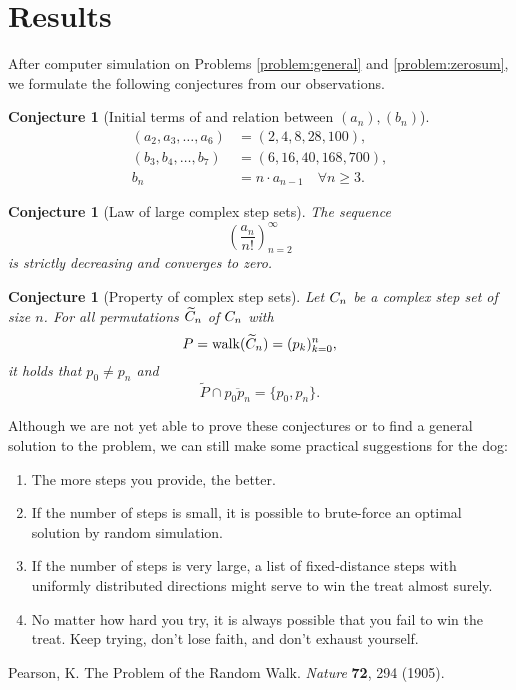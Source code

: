 \documentclass{amsart}
\newtheorem{conjecture}[theorem]{Conjecture}
\theoremstyle{definition}
\theoremstyle{remark}
\begin{document}
\section{Results}

After computer simulation on Problems \ref{problem:general} and \ref{problem:zerosum},
we formulate the following conjectures from our observations.

\begin{conjecture}[Initial terms of and relation between $(a_n),(b_n)$]
    \begin{align*}
        (a_2,a_3,\dots,a_6) & =(2,4,8,28,100),                   \\
        (b_3,b_4,\dots,b_7) & =(6,16,40,168,700),                \\
        b_n                 & =n\cdot a_{n-1}\quad\forall n\ge3.
    \end{align*}
\end{conjecture}

\begin{conjecture}[Law of large complex step sets]
    The sequence \[\left(\frac{a_n}{n!}\right)_{n=2}^\infty\]
    is strictly decreasing and converges to zero.
\end{conjecture}

\begin{conjecture}[Property of complex step sets]
    Let $C_n$ be a complex step set of size $n$. For all permutations
    $\widetilde{C}_n$ of $C_n$ with
    \[P=\mathrm{walk}(\widetilde{C}_n)=(p_k)_{k=0}^{n},\]
    it holds that $p_0\ne p_n$ and
    \[\widetilde{P}\cap\overline{p_0p_n}=\{p_0,p_n\}.\]
\end{conjecture}

Although we are not yet able to prove these conjectures or to
find a general solution to the problem, we can still make
some practical suggestions for the dog:

\begin{enumerate}
    \item The more steps you provide, the better.
    \item If the number of steps is small, it is possible to brute-force
          an optimal solution by random simulation.
    \item If the number of steps is very large, a list of fixed-distance steps with uniformly
          distributed directions might serve to win the treat almost surely.
    \item No matter how hard you try, it is always possible that you fail to win the treat.
          Keep trying, don't lose faith, and don't exhaust yourself.
\end{enumerate}

\begin{thebibliography}{9}

    Pearson, K.
    The Problem of the Random Walk.
    \emph{Nature}
    \textbf{72},
    294 (1905).

\end{thebibliography}
\end{document}
